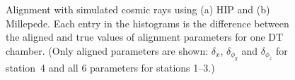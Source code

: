 \begin{figure}


\caption{Alignment with simulated cosmic rays using (a) HIP and (b) Millepede.  Each
  entry in the histograms is the difference between the aligned and
  true values of alignment parameters for one DT
  chamber.  (Only aligned parameters are shown: $\delta_x$,
  $\delta_{\phi_y}$ and $\delta_{\phi_z}$ for station~4 and all 6
  parameters for stations 1--3.) \label{fig:hip_MC}}
\end{figure}

